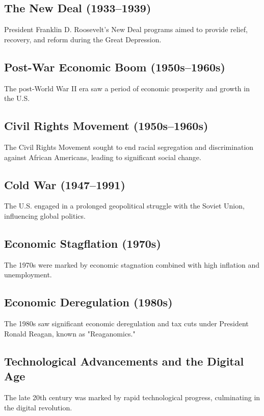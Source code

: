 \documentclass[a4paper,12pt]{book}
\begin{document}
\subsection{The New Deal (1933–1939)}
\label{subsec:new-deal}
President Franklin D. Roosevelt's New Deal programs aimed to provide relief, recovery, and reform during the Great Depression.

\subsection{Post-War Economic Boom (1950s–1960s)}
\label{subsec:post-war-economic-boom}
The post-World War II era saw a period of economic prosperity and growth in the U.S.

\subsection{Civil Rights Movement (1950s–1960s)}
\label{subsec:civil-rights-movement}
The Civil Rights Movement sought to end racial segregation and discrimination against African Americans, leading to significant social change.

\subsection{Cold War (1947–1991)}
\label{subsec:cold-war}
The U.S. engaged in a prolonged geopolitical struggle with the Soviet Union, influencing global politics.

\subsection{Economic Stagflation (1970s)}
\label{subsec:economic-stagflation}
The 1970s were marked by economic stagnation combined with high inflation and unemployment.

\subsection{Economic Deregulation (1980s)}
\label{subsec:economic-deregulation}
The 1980s saw significant economic deregulation and tax cuts under President Ronald Reagan, known as "Reaganomics."

\subsection{Technological Advancements and the Digital Age}
\label{subsec:technological-advancements-digital-age}
The late 20th century was marked by rapid technological progress, culminating in the digital revolution.
\end{document}
